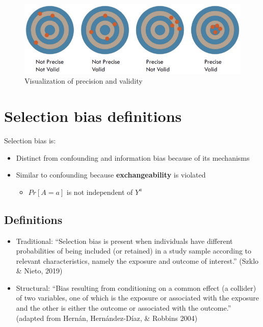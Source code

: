 \documentclass[
]{book}
\providecommand{\tightlist}{%
  \setlength{\itemsep}{0pt}\setlength{\parskip}{0pt}}
\begin{document}
\begin{figure}

{\centering \includegraphics[width=1\linewidth]{img/selection-bias/bullseyes} 

}

\caption{Visualization of precision and validity}\label{fig:unnamed-chunk-20}
\end{figure}

\hypertarget{selection-bias-definitions}{%
\section{Selection bias definitions}\label{selection-bias-definitions}}

Selection bias is:

\begin{itemize}
\tightlist
\item
  Distinct from confounding and information bias because of its mechanisms
\item
  Similar to confounding because \textbf{exchangeability} is violated

  \begin{itemize}
  \tightlist
  \item
    \(Pr[A=a]\) is not independent of \(Y^a\)
  \end{itemize}
\end{itemize}

\hypertarget{definitions}{%
\subsection{Definitions}\label{definitions}}

\begin{itemize}
\tightlist
\item
  Traditional: ``Selection bias is present when individuals have different probabilities of being included (or retained) in a study sample according to relevant characteristics, namely the exposure and outcome of interest.'' (Szklo \& Nieto, 2019)
\item
  Structural: ``Bias resulting from conditioning on a common effect (a collider) of two variables, one of which is the exposure or associated with the exposure and the other is either the outcome or associated with the outcome.'' (adapted from Hernán, Hernández-Díaz, \& Robbins 2004)
\end{itemize}
\end{document}
